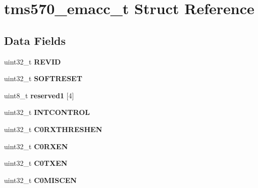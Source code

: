 \hypertarget{structtms570__emacc__t}{}\section{tms570\+\_\+emacc\+\_\+t Struct Reference}
\label{structtms570__emacc__t}
\subsection*{Data Fields}
\begin{DoxyCompactItemize}
\item 
\mbox{\label{structtms570__emacc__t_a00f0088bcee6e414629ce8a080bd0834}} 
uint32\+\_\+t {\bfseries R\+E\+V\+ID}
\item 
\mbox{\label{structtms570__emacc__t_a6845a66abff659723af9885233523bc0}} 
uint32\+\_\+t {\bfseries S\+O\+F\+T\+R\+E\+S\+ET}
\item 
\mbox{\label{structtms570__emacc__t_ac5b99268333b8aa6f41e35e009a764c2}} 
uint8\+\_\+t {\bfseries reserved1} \mbox{[}4\mbox{]}
\item 
\mbox{\label{structtms570__emacc__t_a56be0ad776d088e06e55c0f5547cb00d}} 
uint32\+\_\+t {\bfseries I\+N\+T\+C\+O\+N\+T\+R\+OL}
\item 
\mbox{\label{structtms570__emacc__t_acf0f71d7a5f6a23b2340d5c75111e7fa}} 
uint32\+\_\+t {\bfseries C0\+R\+X\+T\+H\+R\+E\+S\+H\+EN}
\item 
\mbox{\label{structtms570__emacc__t_a4689a6b297cc1b976aecac2e846b33d1}} 
uint32\+\_\+t {\bfseries C0\+R\+X\+EN}
\item 
\mbox{\label{structtms570__emacc__t_a8e040c7c048d41eb00e60ae7cf43553d}} 
uint32\+\_\+t {\bfseries C0\+T\+X\+EN}
\item 
\mbox{\label{structtms570__emacc__t_a401ed66a28cf71b2cb4d75fb25bb53d6}} 
uint32\+\_\+t {\bfseries C0\+M\+I\+S\+C\+EN}
\item 
\mbox{\label{structtms570__emacc__t_a4741118fbe4aeb8b7d63bd14c1e46dc9}} 

\end{DoxyCompactItemize}
